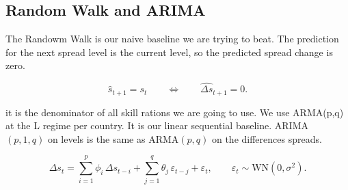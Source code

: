 









\subsection{Random Walk and ARIMA}

\label{sec:models:classical}

The Randowm Walk is our  naive baseline we are trying to beat. The prediction for the next spread level is the current level, so the predicted spread change is zero.

\begin{equation}

  \hat{s}_{t+1}=s_t

  \qquad\Longleftrightarrow\qquad

  \widehat{\Delta s}_{t+1}=0 .

  \label{eq:rw}

\end{equation}

it is the denominator of all skill rations we are going to use. We use ARMA(p,q) at the L regime per country. It is our linear sequential baseline. ARIMA $(p,1,q)$ on levels is the same as ARMA$(p,q)$ on the differences spreads.


\begin{equation}\textbf{}

  \Delta s_t=\sum_{i=1}^{p}\phi_i\,\Delta s_{t-i}

            +\sum_{j=1}^{q}\theta_j\,\varepsilon_{t-j}

            +\varepsilon_t ,

  \qquad \varepsilon_t\sim\mathrm{WN}(0,\sigma^2).

  \label{eq:arima}

\end{equation}

